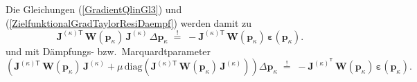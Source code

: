 Die Gleichungen (\ref{GradientQlinGl3}) und (\ref{ZielfunktionalGradTaylorResiDaempf})
werden damit zu
\begin{equation}
 \boldsymbol{J}^{(\kappa) \textsf{T}} \, \mathbf{W}(\mathbf{p}_\kappa) \, 
\boldsymbol{J}^{(\kappa)} \, \Delta \mathbf{p}_\kappa
\; \overset{!}{=} \; 
-  \boldsymbol{J}^{(\kappa) \textsf{T}} \, \mathbf{W}(\mathbf{p}_\kappa) \, 
\boldsymbol{\varepsilon}(\mathbf{p}_\kappa) .
\label{GradientQlinGl3W}
\end{equation}
und mit Dämpfungs- bzw.\ Marquardtparameter
\begin{equation}
\left(
\boldsymbol{J}^{(\kappa) \textsf{T}} \, \mathbf{W}(\mathbf{p}_\kappa) \, \boldsymbol{J}^{(\kappa)}
 + \mu \, \mathrm{diag}(\boldsymbol{J}^{(\kappa) \textsf{T}} \, \mathbf{W}(\mathbf{p}_\kappa) \, \boldsymbol{J}^{(\kappa)}) \right) \Delta \mathbf{p}_\kappa \;
\overset{!}{=} \; - \boldsymbol{J}^{(\kappa)^\textsf{T}} \, 
\mathbf{W}(\mathbf{p}_\kappa) \, \boldsymbol{\varepsilon}(\mathbf{p}_\kappa) .
\label{ZielfunktionalGradTaylorResiDaempfW}
\end{equation}

